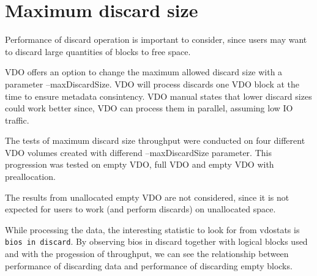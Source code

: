 \documentclass[
  color, %
  table, %
  lof,   %
  lot,   %
]{fithesis3}
\begin{document}
\section{Maximum discard size}
Performance of discard operation is important to consider, since users may want to discard large quantities of blocks to free space.

VDO offers an option to change the maximum allowed discard size with a parameter --maxDiscardSize. VDO will process discards one VDO block at the time to ensure metadata consintency. VDO manual states that lower discard sizes could work better since, VDO can process them in parallel, assuming low IO traffic.

The tests of maximum discard size throughput were conducted on four different VDO volumes created with differend --maxDiscardSize parameter. This progression was tested on empty VDO, full VDO and empty VDO with preallocation.

The results from unallocated empty VDO are not considered, since it is not expected for users to work (and perform discards) on unallocated space.

While processing the data, the interesting statistic to look for from vdostats is \texttt{bios in discard}. By observing bios in discard together with logical blocks used and with the progession of throughput, we can see the relationship between performance of discarding data and performance of discarding empty blocks.
\end{document}
